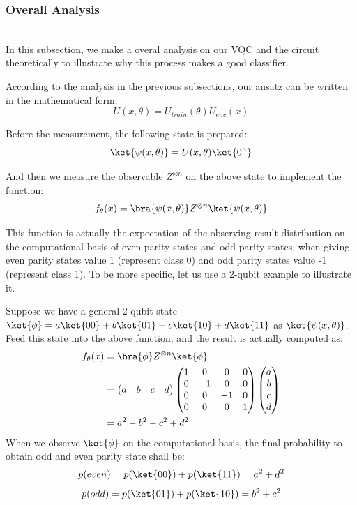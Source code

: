\documentclass[sigconf]{acmart}
\begin{document}
\subsubsection{Overall Analysis}\hfill\\
In this subsection, we make a overal analysis on our VQC and the circuit theoretically to illustrate why this process makes a good classifier.

According to the analysis in the previous subsections, our  ansatz can be written in the mathematical form:
$$U(x,\theta)=U_{train}(\theta)U_{enc}(x)$$

Before the measurement, the following state is prepared:
$$\ket{\psi(x,\theta)}=U(x,\theta)\ket{0^n}$$

And then we measure the observable $Z^{\otimes n}$ on the above state to implement the function:
$$f_\theta(x)=\bra{\psi(x,\theta)}Z^{\otimes n}\ket{\psi(x,\theta)}$$  

This function is actually the expectation of the observing result distribution on the computational basis of even parity states and odd parity states, when giving even parity states value 1 (represent class 0) and odd parity states value -1 (represent class 1). To be more specific, let us use a 2-qubit example to illustrate it.

Suppose we have a general 2-qubit state $\ket{\phi}=a\ket{00}+b\ket{01}+c\ket{10}+d\ket{11}$ as $\ket{\psi(x,\theta)}$. Feed this state into the above function, and the result is actually computed as:
\begin{align*}
	f_\theta(x)&=\bra{\phi}Z^{\otimes n}\ket{\phi}\\
	&=\begin{pmatrix}
		a & b & c & d
		\end{pmatrix}\begin{pmatrix}
		1 & 0 & 0 & 0 \\
		0 & -1 & 0 & 0 \\
		0 & 0 & -1 & 0 \\
		0 & 0 & 0 & 1 
	\end{pmatrix}\begin{pmatrix}
	a \\
	b \\
	c \\
	d 
	\end{pmatrix}\\
    &=a^2-b^2-c^2+d^2
\end{align*}
When we observe $\ket{\phi}$ on the computational basis, the final probability to obtain odd and even parity state shall be:
$$p(even)=p(\ket{00})+p(\ket{11})=a^2+d^2$$
$$p(odd)=p(\ket{01})+p(\ket{10})=b^2+c^2$$
\end{document}
